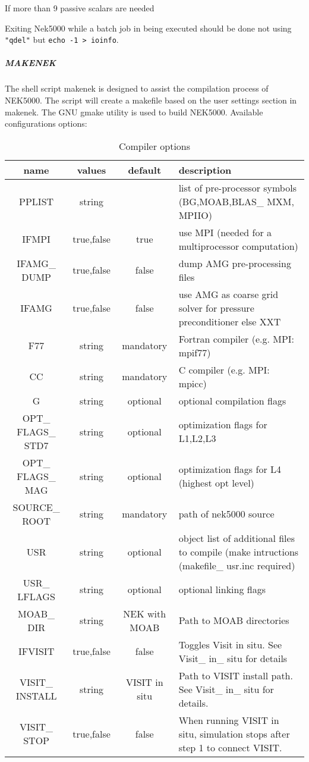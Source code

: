 If more than 9 passive scalars are needed

Exiting Nek5000 while a batch job in being executed should be done not using \texttt{"qdel"} but \texttt{echo -1 > ioinfo}. 

\subparagraph*{MAKENEK}
 The shell script makenek is designed to assist the compilation process of NEK5000. The script will create a makefile based on the user settings section in makenek. The GNU gmake utility is used to build NEK5000.
Available configurations options:
\begin{table}[tb!]
\caption[Makenek]
{Compiler options} 
\label{tab:bdms}
\begin{center}
\begin{tabularx}{\textwidth}{@{} c c c Y @{}} %
 \hline\hline 
  name 	&values 	&default 	&description \\ \hline\hline 
  PPLIST &	string 	&&	list of pre-processor symbols (BG,MOAB,BLAS\_ MXM, MPIIO)  \\ \hline
IFMPI &	true,false &true &	use MPI (needed for a multiprocessor computation) \\ \hline
IFAMG\_ DUMP & 	true,false 	&false &	dump AMG pre-processing files  \\ \hline
IFAMG 	&true,false &	false &	use AMG as coarse grid solver for pressure preconditioner else XXT  \\ \hline
F77 	&string &	mandatory 	&Fortran compiler (e.g. MPI: mpif77)  \\ \hline
CC &	string &	mandatory 	&C compiler (e.g. MPI: mpicc)  \\ \hline
G& 	string 	&optional &	optional compilation flags  \\ \hline
OPT\_ FLAGS\_ STD7 &	string &	optional &	optimization flags for L1,L2,L3  \\ \hline
OPT\_ FLAGS\_ MAG &	string &	optional& 	optimization flags for L4 (highest opt level)  \\ \hline
SOURCE\_ ROOT &	string &	mandatory &	path of nek5000 source  \\ \hline
USR 	&string &	optional &	object list of additional files to compile (make intructions (makefile\_ usr.inc required)  \\ \hline
USR\_ LFLAGS &	string &	optional &	optional linking flags  \\ \hline
MOAB\_ DIR &	string 	&NEK with MOAB &	Path to MOAB directories  \\ \hline
IFVISIT 	&true,false &	false 	&Toggles Visit in situ. See Visit\_ in\_ situ for details  \\ \hline
VISIT\_ INSTALL &	string &VISIT in situ &	Path to VISIT install path. See Visit\_ in\_ situ for details.  \\ \hline
VISIT\_ STOP 	&true,false &	false 	&When running VISIT in situ, simulation stops after step 1 to connect VISIT.  \\
 \hline\hline
\end{tabularx}
\end{center}
\end{table}



